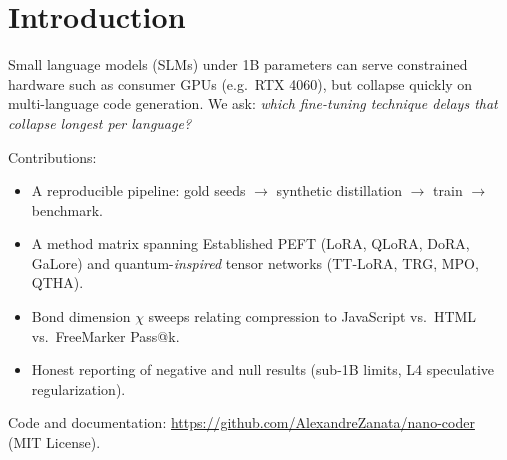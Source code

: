 \section{Introduction}

Small language models (SLMs) under 1B parameters can serve constrained hardware such as
consumer GPUs (e.g.\ RTX 4060), but collapse quickly on multi-language code generation.
We ask: \emph{which fine-tuning technique delays that collapse longest per language?}

Contributions:
\begin{itemize}
  \item A reproducible pipeline: gold seeds $\rightarrow$ synthetic distillation $\rightarrow$ train $\rightarrow$ benchmark.
  \item A method matrix spanning Established PEFT (LoRA, QLoRA, DoRA, GaLore) and quantum-\emph{inspired} tensor networks (TT-LoRA, TRG, MPO, QTHA).
  \item Bond dimension $\chi$ sweeps relating compression to JavaScript vs.\ HTML vs.\ FreeMarker Pass@k.
  \item Honest reporting of negative and null results (sub-1B limits, L4 speculative regularization).
\end{itemize}

Code and documentation: \url{https://github.com/AlexandreZanata/nano-coder} (MIT License).
